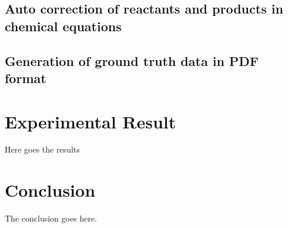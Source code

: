\documentclass[conference]{IEEEtran}
\begin{document}
\subsection{Auto correction of reactants and products in chemical equations}
\subsection{Generation of ground truth data in PDF format}




\section{Experimental Result}

Here goes the results


\section{Conclusion}
The conclusion goes here.














\end{document}
